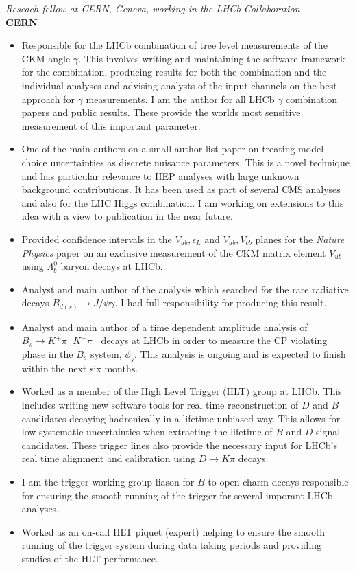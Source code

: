 \documentclass[margin, 10pt]{res} %
\begin{document}
\begin{resume}
{\sl Reseach fellow at CERN, Geneva, working in the LHCb Collaboration}\\
{\bf CERN}
\begin{itemize} \itemsep -2pt
\item Responsible for the LHCb combination of tree level measurements of the CKM angle $\gamma$. This involves writing and maintaining the software framework for the combination, producing results for both the combination and the individual analyses and advising analysts of the input channels on the best approach for $\gamma$ measurements. I am the author for all LHCb $\gamma$ combination papers and public results. These provide the worlds most sensitive measurement of this important parameter.
\item One of the main authors on a small author list paper on treating model choice uncertainties as discrete nuisance parameters. This is a novel technique and has particular relevance to HEP analyses with large unknown background contributions. It has been used as part of several CMS analyses and also for the LHC Higgs combination. I am working on extensions to this idea with a view to publication in the near future.
\item Provided confidence intervals in the $V_{ub}, \epsilon_{L}$ and $V_{ub}, V_{cb}$ planes for the \textit{Nature Physics} paper on an exclusive measurement of the CKM matrix element $V_{ub}$ using $\Lambda_{b}^{0}$ baryon decays at LHCb.
\item Analyst and main author of the analysis which searched for the rare radiative decays $B_{d(s)}\rightarrow J/\psi \gamma$. I had full responsibility for producing this result.
\item Analyst and main author of a time dependent amplitude analysis of $B_{s}\rightarrow K^{+}\pi^{-}K^{-}\pi^{+}$ decays at LHCb in order to measure
  the CP violating phase in the $B_{s}$ system, $\phi_{s}$. This analysis is ongoing and is expected to finish within the next six months.
\item Worked as a member of the High Level Trigger (HLT) group at LHCb. This includes writing new software tools for real time reconstruction of $D$ and $B$ candidates decaying hadronically in a lifetime unbiased way. This allows for low systematic uncertainties when extracting the lifetime of $B$ and $D$ signal candidates. These trigger lines also provide the necessary input for LHCb's real time alignment and calibration using $D\rightarrow K\pi$ decays.
\item I am the trigger working group liason for $B$ to open charm decays responsible for ensuring the smooth running of the trigger for several imporant LHCb analyses.
\item Worked as an on-call HLT piquet (expert) helping to ensure the smooth running of the trigger system during data taking periods and providing studies of the HLT performance.
\end{itemize}


\end{resume}
\end{document}
